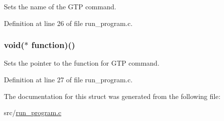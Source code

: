 Sets the name of the GTP command. 



Definition at line 26 of file run\_\-program.c.

\hypertarget{structcommand__func_a6922e0c4b7e05be375cde200d2788c89}{
\subsubsection[{function}]{\setlength{\rightskip}{0pt plus 5cm}void($\ast$ {\bf function})()}}
\label{structcommand__func_a6922e0c4b7e05be375cde200d2788c89}


Sets the pointer to the function for GTP command. 



Definition at line 27 of file run\_\-program.c.



The documentation for this struct was generated from the following file:\begin{DoxyCompactItemize}
\item 
src/\hyperlink{run__program_8c}{run\_\-program.c}\end{DoxyCompactItemize}
